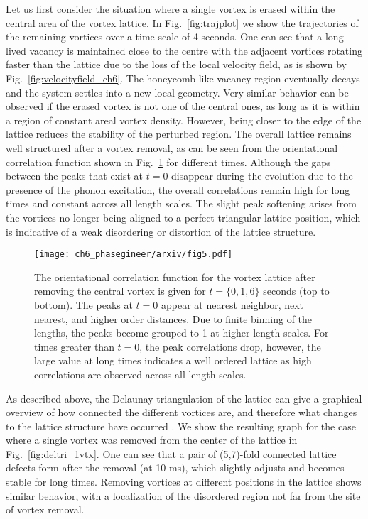 Let us first consider the situation where a single vortex is erased within the central area of the vortex lattice. In Fig.~\ref{fig:trajplot} we show the trajectories of the remaining vortices over a time-scale of 4 seconds. One can see that a long-lived vacancy is maintained close to the centre with the adjacent vortices rotating faster than the lattice due to the loss of the local velocity field, as is shown by Fig.~\ref{fig:velocityfield_ch6}. The honeycomb-like vacancy region eventually decays and the system settles into a new local geometry. Very similar behavior can be observed if the erased vortex is not one of the central ones, as long as it is within a region of constant areal vortex density. However, being closer to the edge of the lattice reduces the stability of the perturbed region. The overall lattice remains well structured after a vortex removal, as can be seen from the orientational correlation function shown in Fig.~\ref{fig:g6} for different times. Although the gaps between the peaks that exist at $t=0$ disappear during the evolution due to the presence of the phonon excitation, the overall correlations remain high for long times and constant across all length scales. The slight peak softening arises from the vortices no longer being aligned to a perfect triangular lattice position, which is indicative of a weak disordering or distortion of the lattice structure.

\begin{figure}[h!]\centering
    \texttt{[image: ch6\_phasegineer/arxiv/fig5.pdf]}
    \caption{The orientational correlation function for the vortex lattice after removing the central vortex is given for $t=\{0,1,6\}$ seconds (top to bottom). The peaks at $t=0$ appear at nearest neighbor, next nearest, and higher order distances. Due to finite binning of the lengths, the peaks become grouped to 1 at higher length scales. For times greater than $t=0$, the peak correlations drop, however, the large value at long times indicates a well ordered lattice as high correlations are observed across all length scales.}\label{fig:g6}
\end{figure}

As described above, the Delaunay triangulation of the lattice can give a graphical overview of how connected the different vortices are, and therefore what changes to the lattice structure have occurred \cite{Guillamon_nat_2014}. We show the resulting graph for the case where a single vortex was removed from the center of the lattice in Fig.~\ref{fig:deltri_1vtx}. One can see that a pair of (5,7)-fold connected lattice defects form after the removal (at 10 ms), which slightly adjusts and becomes stable for long times. Removing vortices at different positions in the lattice shows similar behavior, with a localization of the disordered region not far from the site of vortex removal.


